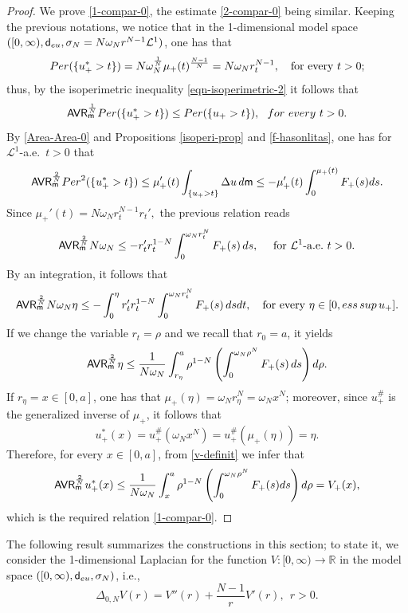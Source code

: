 \documentclass[11pt, reqno]{amsart}
\numberwithin{equation}{section}
\begin{document}
		\begin{proof}
			We  prove \eqref{1-compar-0}, the estimate \eqref{2-compar-0} being similar. Keeping the previous notations, we notice that in the 1-dimensional model space 
			$([0,\infty),{\sf d}_{\rm eu},\sigma_N=N\omega_Nr^{N-1}\mathcal L^1)$, one has   that 
			\begin{equation}\label{eq:model-space-equal}
					{\rm Per}(\{u_+^*>t\})=N\omega_N^\frac{1}{N}\mu_+(t)^\frac{N-1}{N}=N\omega_N r_t^{N-1}, \quad \text{for every $t>0$};
			\end{equation}
				thus, by the isoperimetric inequality \eqref{eqn-isoperimetric-2} it follows that 
			\begin{equation}\label{Area-Area-0}
				{\sf AVR}_ {\sf m}^\frac{1}{N}	{\rm Per}(\{u_+^*>t\})\leq {\rm Per}(\{u_+>t\}),  \ \ {\rm for\  every}\ t>0.
			\end{equation}
			By \eqref{Area-Area-0} and Propositions \ref{isoperi-prop} and \ref{f-hasonlitas}, one has for $\mathcal L^1$-a.e.\ $t>0$ that
			$${\sf AVR}_ {\sf m}^\frac{2}{N}	{\rm Per}^2(\{u_+^*>t\})\leq \mu_+'(t)\int_{\{u_+>t\}}\Delta u\,{\rm d}{\sf m}\leq  -\mu_+'(t)\int_0^{\mu_+(t)} F_+(s){\rm d}s.$$ Since 
			$\mu_+'(t)=N\omega_N r_t^{N-1}r_t',
			$
			the previous relation reads
			$${\sf AVR}_ {\sf m}^\frac{2}{N} N\omega_N\leq -r_t'r_t^{1-N}\int_0^{\omega_N r_t^N} F_+(s)\,{\rm d}s, \quad \text{ for ${\mathcal L}^1$-a.e.\ $t>0$.}$$
			By an integration, it follows  that
			$${\sf AVR}_ {\sf m}^\frac{2}{N} N\omega_N\eta\leq -\int_0^\eta r_t'r_t^{1-N}\int_0^{\omega_N r_t^N} F_+(s)\, {\rm d}s{\rm d}t, \quad \text{for every $\eta\in [0,{\rm ess\,sup}\, u_+]$}.$$
			If we change the variable $r_t=\rho$ and we recall that $r_0=a$, it yields
			$${\sf AVR}_ {\sf m}^\frac{2}{N}\eta\leq \frac{1}{N\omega_N}\int_{r_\eta}^a \rho^{1-N}\left(\int_0^{\omega_N \rho^N} F_+(s)\, {\rm d}s\right){\rm d}\rho.$$
			If $r_\eta=x\in [0,a]$, one has that $\mu_+(\eta)=\omega_N r_\eta^N=\omega_N x^N$; moreover, since $u_+^\#$ is the generalized inverse of $\mu_+$, it follows that 
			$$u_+^*(x)=u_+^\#(\omega_N x^N)=u_+^\#(\mu_+(\eta))=\eta.$$ Therefore, for every $x\in [0,a]$, from \eqref{v-definit} we infer that 
			$${\sf AVR}_ {\sf m}^\frac{2}{N} u_+^*(x)\leq \frac{1}{N\omega_N}\int_{x}^a \rho^{1-N}\left(\int_0^{\omega_N \rho^N} F_+(s){\rm d}s\right){\rm d}\rho=V_+(x),$$
			which is the required relation \eqref{1-compar-0}.
		\end{proof}
		
		The following result summarizes the constructions in this section; to state it, we consider the 1-dimensional Laplacian for the function $V:[0,\infty)\to \mathbb R$ in the model space $([0,\infty),{\sf d}_{\rm eu},\sigma_N)$, i.e., 
		\begin{equation}\label{def-1-laplace}
			\Delta_{0,N} V(r)=V''(r)+\frac{N-1}{r}V'(r),\ \ r>0.
		\end{equation}
		
\end{document}

